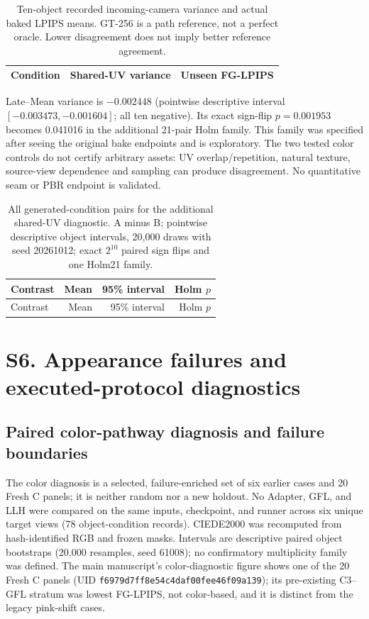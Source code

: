 \documentclass[11pt]{article}
\begin{document}
\begin{table}[ht]\centering\small
\caption{Ten-object recorded incoming-camera variance and actual baked LPIPS means. GT-256 is a path reference, not a perfect oracle. Lower disagreement does not imply better reference agreement.}\label{tab:cross-view015}
\begin{tabular}{lrr}\toprule Condition & Shared-UV variance & Unseen FG-LPIPS \\
\midrule\bottomrule\end{tabular}
\end{table}
Late--Mean variance is $-0.002448$ (pointwise descriptive interval $[-0.003473,-0.001604]$; all ten negative). Its exact sign-flip $p=0.001953$ becomes 0.041016 in the additional 21-pair Holm family. This family was specified after seeing the original bake endpoints and is exploratory. The two tested color controls do not certify arbitrary assets: UV overlap/repetition, natural texture, source-view dependence and sampling can produce disagreement. No quantitative seam or PBR endpoint is validated.

\begin{longtable}{p{}rrr}
\caption{All generated-condition pairs for the additional shared-UV diagnostic. A minus B; pointwise descriptive object intervals, 20,000 draws with seed 20261012; exact $2^{10}$ paired sign flips and one Holm21 family.}\label{tab:cross-view-all015}\\
\toprule Contrast & Mean & 95\% interval & Holm $p$ \\
\midrule\endfirsthead\toprule Contrast & Mean & 95\% interval & Holm $p$ \\
\midrule\endhead

\bottomrule\end{longtable}

\FloatBarrier
\section*{S6. Appearance failures and executed-protocol diagnostics}
\label{supp:group6}

\subsection*{Paired color-pathway diagnosis and failure boundaries}
The color diagnosis is a selected, failure-enriched set of six earlier cases and 20 Fresh C panels; it is neither random nor a new holdout. No Adapter, GFL, and LLH were compared on the same inputs, checkpoint, and runner across six unique target views (78 object-condition records). CIEDE2000 was recomputed from hash-identified RGB and frozen masks. Intervals are descriptive paired object bootstraps (20,000 resamples, seed 61008); no confirmatory multiplicity family was defined. The main manuscript's color-diagnostic figure shows one of the 20 Fresh C panels (UID \texttt{f6979d7ff8e54c4daf00fee46f09a139}); its pre-existing C3--GFL stratum was lowest FG-LPIPS, not color-based, and it is distinct from the legacy pink-shift cases.
\end{document}
